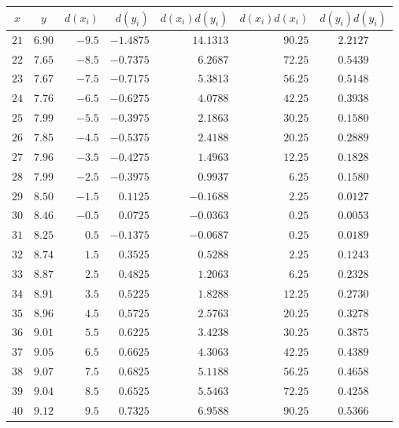 \begin{tabular}{ccrrrrc} \toprule
$x$  & $y$    & $d(x_i)$ & $d(y_i)$  & $d(x_i)d(y_i)$ & $d(x_i)d(x_i)$ & $d(y_i)d(y_i)$ \\\midrule
$21$ & $6.90$ & $-9.5$   & $-1.4875$ & $14.1313$      & $90.25$       & $2.2127$ \\
$22$ & $7.65$ & $-8.5$   & $-0.7375$ & $6.2687$       & $72.25$       & $0.5439$ \\
$23$ & $7.67$ & $-7.5$   & $-0.7175$ & $5.3813$       & $56.25$       & $0.5148$ \\
$24$ & $7.76$ & $-6.5$   & $-0.6275$ & $4.0788$       & $42.25$       & $0.3938$ \\
$25$ & $7.99$ & $-5.5$   & $-0.3975$ & $2.1863$       & $30.25$       & $0.1580$ \\
$26$ & $7.85$ & $-4.5$   & $-0.5375$ & $2.4188$       & $20.25$       & $0.2889$ \\
$27$ & $7.96$ & $-3.5$   & $-0.4275$ & $1.4963$       & $12.25$       & $0.1828$ \\
$28$ & $7.99$ & $-2.5$   & $-0.3975$ & $0.9937$       & $6.25$        & $0.1580$ \\
$29$ & $8.50$ & $-1.5$   & $0.1125$  & $-0.1688$      & $2.25$        & $0.0127$ \\
$30$ & $8.46$ & $-0.5$   & $0.0725$  & $-0.0363$      & $0.25$        & $0.0053$ \\
$31$ & $8.25$ & $0.5$    & $-0.1375$ & $-0.0687$      & $0.25$        & $0.0189$ \\
$32$ & $8.74$ & $1.5$    & $0.3525$  & $0.5288$       & $2.25$        & $0.1243$ \\
$33$ & $8.87$ & $2.5$    & $0.4825$  & $1.2063$       & $6.25$        & $0.2328$ \\
$34$ & $8.91$ & $3.5$    & $0.5225$  & $1.8288$       & $12.25$       & $0.2730$ \\
$35$ & $8.96$ & $4.5$    & $0.5725$  & $2.5763$       & $20.25$       & $0.3278$ \\
$36$ & $9.01$ & $5.5$    & $0.6225$  & $3.4238$       & $30.25$       & $0.3875$ \\
$37$ & $9.05$ & $6.5$    & $0.6625$  & $4.3063$       & $42.25$       & $0.4389$ \\
$38$ & $9.07$ & $7.5$    & $0.6825$  & $5.1188$       & $56.25$       & $0.4658$ \\
$39$ & $9.04$ & $8.5$    & $0.6525$  & $5.5463$       & $72.25$       & $0.4258$ \\
$40$ & $9.12$ & $9.5$    & $0.7325$  & $6.9588$       & $90.25$       & $0.5366$ \\\bottomrule
\end{tabular}
